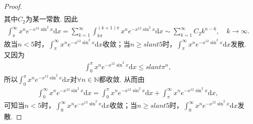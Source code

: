 \documentclass[../../main.tex]{subfiles}
\begin{document}
\begin{proof}
\begin{align*}
\end{align*}
其中$C_2$为某一常数. 因此
\begin{align*}
\int_{\pi}^{\infty}x^ne^{-x^{12}\sin^2x}\mathrm{d}x=\sum_{k=1}^{\infty}\int_{k\pi}^{(k+1)\pi}x^ne^{-x^{12}\sin^2x}\mathrm{d}x\sim \sum_{k=1}^{\infty}C_2k^{n-6},\quad k\rightarrow \infty.
\end{align*}
故当$n<5$时，$\int_{\pi}^{\infty}x^ne^{-x^{12}\sin^2x}\mathrm{d}x$收敛；当$n\geqslant slant 5$时，$\int_{\pi}^{\infty}x^ne^{-x^{12}\sin^2x}\mathrm{d}x$发散. 又因为
\begin{align*}
\int_0^{\pi}x^ne^{-x^{12}\sin^2x}\mathrm{d}x\leqslant slant \pi^n,
\end{align*}
所以$\int_0^{\pi}x^ne^{-x^{12}\sin^2x}\mathrm{d}x$对$\forall n\in \mathbb{N}$都收敛. 从而由
\begin{align*}
\int_0^{\infty}x^ne^{-x^{12}\sin^2x}\mathrm{d}x=\int_0^{\pi}x^ne^{-x^{12}\sin^2x}\mathrm{d}x+\int_{\pi}^{\infty}x^ne^{-x^{12}\sin^2x}\mathrm{d}x,
\end{align*}
可知当$n<5$时，$\int_0^{\infty}x^ne^{-x^{12}\sin^2x}\mathrm{d}x$收敛；当$n\geqslant slant 5$时，$\int_0^{\infty}x^ne^{-x^{12}\sin^2x}\mathrm{d}x$发散.
\end{proof}
\end{document}
